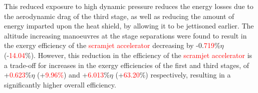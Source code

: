 This reduced exposure to high dynamic pressure reduces the energy losses due to the aerodynamic drag of the third stage, as well as reducing the amount of energy imparted upon the heat shield, by allowing it to be jettisoned earlier. 
The altitude increasing manoeuvres at the stage separations were found to result in the exergy efficiency of the \textcolor{red}{scramjet accelerator} decreasing by -0.\textcolor{red}{719}\%$\eta$ (-\textcolor{red}{14.04}\%). However, this reduction in the efficiency of the \textcolor{red}{scramjet accelerator} is a trade-off for increases in the exergy efficiencies of the first and third stages, of +\textcolor{red}{0.623}\%$\eta$ (+\textcolor{red}{9.96\%}) and +\textcolor{red}{6.013}\%$\eta$ (+\textcolor{red}{63.20}\%) respectively, resulting in a significantly higher overall efficiency.


